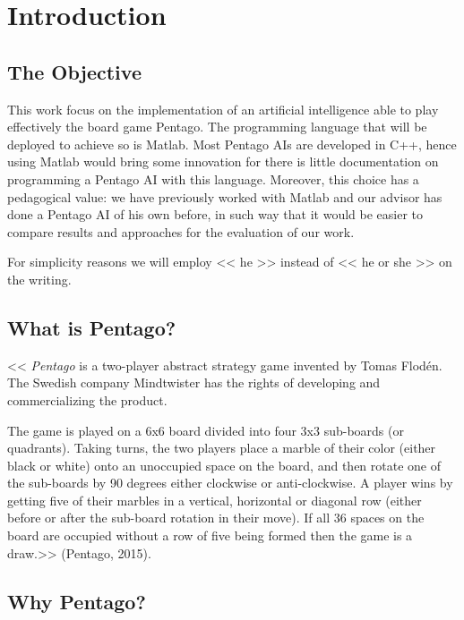 \section{Introduction}

\subsection{The Objective}

This work focus on the implementation of an artificial intelligence able to
play effectively the board game Pentago. The programming language that will be
deployed to achieve so is Matlab. Most Pentago AIs are developed in C++, hence
using Matlab would bring some innovation for there is little documentation on
programming a Pentago AI with this language. Moreover, this choice has a
pedagogical value: we have previously worked with Matlab and our advisor has
done a Pentago AI of his own before, in such way that it would be easier to
compare results and approaches for the evaluation of our work.

\vspace{10pt}

For simplicity reasons we will employ << he >> instead of << he or she >> on
the writing.

\subsection{What is Pentago?}

<< \textit{Pentago} is a two-player abstract strategy game invented by Tomas
Flodén. The Swedish company Mindtwister has the rights of developing and
commercializing the product.

\vspace{10pt}

The game is played on a 6x6 board divided into four 3x3 sub-boards (or
quadrants). Taking turns, the two players place a marble of their color (either
black or white) onto an unoccupied space on the board, and then rotate one of
the sub-boards by 90 degrees either clockwise or anti-clockwise. A player wins
by getting five of their marbles in a vertical, horizontal or diagonal row
(either before or after the sub-board rotation in their move). If all 36 spaces
on the board are occupied without a row of five being formed then the game is a
draw.>> (Pentago, 2015).


\subsection{Why Pentago?}


